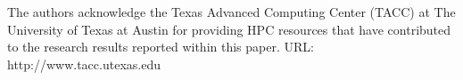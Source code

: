 

\vskip 1cm

The authors acknowledge the Texas Advanced Computing Center (TACC) at The University of Texas at Austin for providing HPC resources that have contributed to the research results reported within this paper. URL: http://www.tacc.utexas.edu



\vskip 2cm
\noindent \AUTHOR \\
\PLACE \\
\DATE

